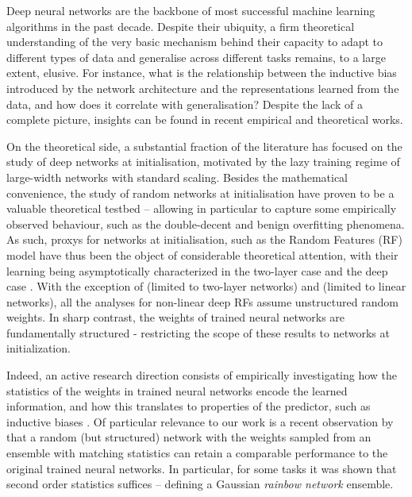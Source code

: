 Deep neural networks are the backbone of most successful machine learning algorithms in the past decade. Despite their ubiquity, a firm theoretical understanding of the very basic mechanism behind their capacity to adapt to different types of data and generalise across different tasks remains, to a large extent, elusive. For instance, what is the relationship between the inductive bias introduced by the network architecture and the representations learned from the data, and how does it correlate with generalisation? Despite the lack of a complete picture, insights can be found in recent empirical and theoretical works.

On the theoretical side, a substantial fraction of the literature has focused on the study of deep networks at initialisation, motivated by the lazy training regime of large-width networks with standard scaling. Besides the mathematical convenience, the study of random networks at initialisation have proven to be a valuable theoretical testbed -- allowing in particular to capture some empirically observed behaviour, such as the double-decent \cite{belkin2019reconciling} and benign overfitting \cite{Bartlett20} phenomena. As such, proxys for networks at initialisation, such as the Random Features (RF) model \cite{Rahimi2007RandomFF} have thus been the object of considerable theoretical attention, with their learning being asymptotically characterized in the two-layer case \cite{Goldt2021TheGE, Goldt2020ModellingTI, Gerace2020GeneralisationEI, Hu2020UniversalityLF, Dhifallah2020, Mei2019TheGE, Mei2021GeneralizationEO} and the deep case \cite{ZavatoneVeth2022ContrastingRA, schroder2023deterministic, bosch2023precise, zavatone2023learning}. With the exception of \cite{Gerace2020GeneralisationEI, mel2022anisotropic} (limited to two-layer networks) and \cite{zavatone2023learning} (limited to linear networks), all the analyses for non-linear deep RFs assume unstructured random weights. In sharp contrast, the weights of trained neural networks are fundamentally structured - restricting the scope of these results to networks at initialization.

Indeed, an active research direction consists of empirically investigating how the statistics of the weights in trained neural networks encode the learned information, and how this translates to properties of the predictor, such as inductive biases \cite{Thamm_2022, JMLR:v22:20-410}. Of particular relevance to our work is a recent observation by \cite{guth2023rainbow} that a random (but structured) network with the weights sampled from an ensemble with matching statistics can retain a comparable performance to the original trained neural networks. In particular, for some tasks it was shown that second order statistics suffices -- defining a Gaussian \emph{rainbow network} ensemble.

